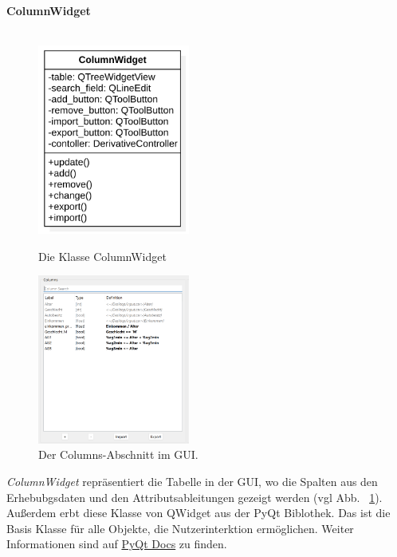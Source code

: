 \documentclass{article}
\begin{document}
\newpage
\textbf{\large{ColumnWidget}}\\\\
\begin{figure}[H]%
    \centering
    \begin{minipage}[b]{0.4\textwidth}
        \includegraphics[width=5cm]{entwurf/Entwurf_dokument/img/klassenView/ColumnWidget.png}
        \caption{Die Klasse ColumnWidget}
    \end{minipage}
    \hfill
    \begin{minipage}[b]{0.4\textwidth}
        \includegraphics[width=5cm]{entwurf/Entwurf_dokument/img/Alissa/Columns.png} 
    \caption{Der Columns-Abschnitt im GUI.}
    \label{fig:ColumnsGUI}
    \end{minipage}
\end{figure}
\textit{ColumnWidget} repräsentiert die Tabelle in der GUI, wo die Spalten aus den Erhebubgsdaten und den Attributsableitungen gezeigt werden (vgl Abb. ~\ref{fig:ColumnsGUI}). Außerdem erbt diese Klasse von QWidget aus der PyQt Biblothek. Das ist die Basis Klasse für alle Objekte, die Nutzerinterktion ermöglichen. Weiter Informationen sind auf \href{https://doc.qt.io/qt-6/qwidget.html}{PyQt Docs} zu finden.
\newline 
\end{document}
